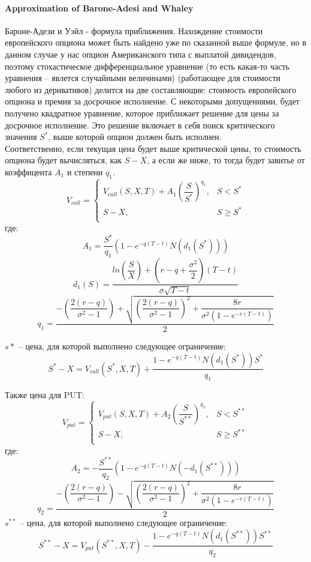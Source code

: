 \documentclass[a4paper]{article}
\begin{document}
\paragraph*{Approximation of Barone-Adesi and Whaley}
Бароне-Адези и Уэйл - формула приближения. Нахождение стоимости европейского опциона может быть найдено уже по сказанной выше формуле, но в данном случае у нас опцион Американского типа с выплатой дивидендов, поэтому стохастическое дифференциальное уравнение (то есть какая-то часть уравнения -- явлется случайными величинами) (работающее для стоимости любого из деривативов) делится на две составляющие: стоимость европейского опциона и премия за досрочное исполнение. С некоторыми допущениями, будет получено квадратное уравнение, которое приближает решение для цены за досрочное исполнение. Это решение включает в себя поиск критического значения $S^*$, выше которой опцион должен быть исполнен. \\
Соответственно, если текущая цена будет выше критической цены, то стоимость опциона будет вычисляться, как $S - X$, а если же ниже, то тогда будет завитье от коэффицента $A_1$ и степени $q_1$.\\ 

\begin{equation*}
    V_{call} = 
    \begin{cases}
        V_{call}(S, X, T) + A_1 \left(\dfrac{S}{S^*} \right)^{q_1}, &S < S^*\\
        S-X, &S \geq S^* \\
    \end{cases}
\end{equation*}
где:
\[A_1 = \dfrac{S^*}{q_1} \left( 1 - e^{-q(T - t)} N(d_1(S^*)) \right)\]
\[d_1(S) = \dfrac{ln \left( \dfrac{S}{X} \right) + (r - q + \dfrac{\sigma^2}{2}) (T-t)}{\sigma \sqrt{T - t}}\]
\[q_1 = \dfrac{ - \left(\dfrac{2 (r - q)}{\sigma^2 - 1 }\right) + \sqrt{ \left(\dfrac{2 (r - q)}{\sigma^2 - 1 }\right)^2 + \dfrac{8r}{\sigma^2 (1 - e^{-r (T-t)})}}}{2}\]

$s*$ -- цена, для которой выполнено следующее ограничение:
\[S^* - X = V_{call}(S^*, X, T) + \dfrac{1 - e^{-q(T - t)} N(d_1(S^*)) S^*}{q_1}\]

Также цена для PUT:
\begin{equation*}
    V_{put} = 
    \begin{cases}
        V_{put}(S, X, T) + A_2 \left(\dfrac{S}{S^{**}} \right)^{q_2}, &S < S^{**}\\
        S-X, &S \geq S^{**} \\
    \end{cases}
\end{equation*}
где:
\[A_2 = -\dfrac{S^{**}}{q_2} \left( 1 - e^{-q(T - t)} N(-d_1(S^{**})) \right)\]
\[q_2 = \dfrac{ - \left(\dfrac{2 (r - q)}{\sigma^2 - 1 }\right) - \sqrt{ \left(\dfrac{2 (r - q)}{\sigma^2 - 1 }\right)^2 + \dfrac{8r}{\sigma^2 (1 - e^{-r (T-t)})}}}{2}\]
$s^{**}$ -- цена, для которой выполнено следующее ограничение:
\[S^{**} - X = V_{put}(S^{**}, X, T) - \dfrac{1 - e^{-q(T - t)} N(d_1(S^{**})) S^{**}}{q_2}\]
\end{document}
